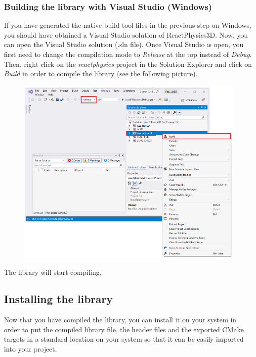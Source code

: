 \documentclass[a4paper,12pt]{article}
\begin{document}
     \subsubsection{Building the library with Visual Studio (Windows)}

     If you have generated the native build tool files in the previous step on Windows, you should have obtained a Visual Studio solution of ReactPhysics3D.
     Now, you can open the Visual Studio solution (.sln file). Once Visual Studio is open, you first need to change the compilation mode to \emph{Release}
     at the top instead of \emph{Debug}. Then, right click on the \emph{reactphysics} project in the Solution
     Explorer and click on \emph{Build} in order to compile the library (see the following picture).

    \begin{figure}[!ht]
        \centering
        \includegraphics[scale=0.6]{VSBuild.png}
        \label{fig:vsbuild}
    \end{figure}

    The library will start compiling.

     \subsection{Installing the library}

     Now that you have compiled the library, you can install it on your system in order to put the compiled library file, the header files and the exported
     CMake targets in a standard location on your system so that it can be easily imported into your project.
    
\end{document}
